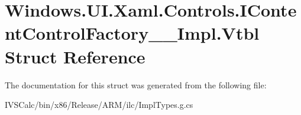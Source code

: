 \hypertarget{struct_windows_1_1_u_i_1_1_xaml_1_1_controls_1_1_i_content_control_factory_____impl_1_1_vtbl}{}\section{Windows.\+U\+I.\+Xaml.\+Controls.\+I\+Content\+Control\+Factory\+\_\+\+\_\+\+Impl.\+Vtbl Struct Reference}
\label{struct_windows_1_1_u_i_1_1_xaml_1_1_controls_1_1_i_content_control_factory_____impl_1_1_vtbl}


The documentation for this struct was generated from the following file\+:\begin{DoxyCompactItemize}
\item 
I\+V\+S\+Calc/bin/x86/\+Release/\+A\+R\+M/ilc/Impl\+Types.\+g.\+cs\end{DoxyCompactItemize}
